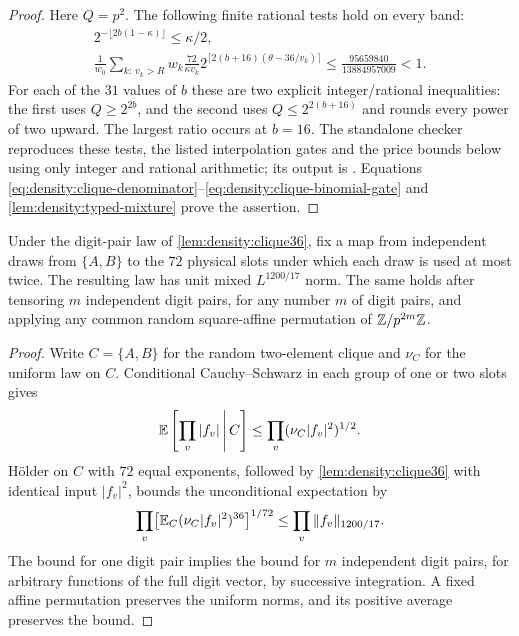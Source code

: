 \begin{proof}
Here $Q=p^2$. The following finite rational tests hold on every band:
\begin{gather}
 2^{-\lfloor2b(1-\kappa)\rfloor}\le\kappa/2,
 \label{eq:density:clique-denominator}\\
 \frac1{w_0}\sum_{k:\,v_k>R}w_k\frac{72}{\kappa v_k}
 2^{\lceil2(b+16)(\theta-36/v_k)\rceil}
 \le\frac{95659840}{13884957009}<1.
 \label{eq:density:clique-binomial-gate}
\end{gather}
For each of the $31$ values of $b$ these are two explicit integer/rational inequalities: the first uses
$Q\ge2^{2b}$, and the second uses $Q\le2^{2(b+16)}$ and rounds every power
of two upward. The largest ratio occurs at $b=16$.
The standalone checker
reproduces these tests, the listed interpolation gates and the price
bounds below using only integer and rational arithmetic; its output is
.
Equations \eqref{eq:density:clique-denominator}--\eqref{eq:density:clique-binomial-gate}
and \cref{lem:density:typed-mixture} prove the assertion.
\end{proof}

\begin{lemma}\label{lem:density:clique-copies}
Under the digit-pair law of \cref{lem:density:clique36}, fix a map from independent draws from $\{A,B\}$ to the $72$ physical slots under which each draw is used at most twice.
The resulting law has unit mixed $L^{1200/17}$ norm. The same holds after
tensoring $m$ independent digit pairs, for any number $m$ of
digit pairs, and applying any common random square-affine
permutation of $\mathbb Z/p^{2m}\mathbb Z$.
\end{lemma}
\begin{proof}
Write $C=\{A,B\}$ for the random two-element clique and $\nu_C$ for the uniform law on $C$.
Conditional Cauchy--Schwarz in each group of one or two slots gives
\[
 \mathbb E\left[\prod_v|f_v|\,\middle|\,C\right]
 \le\prod_v(\nu_C|f_v|^2)^{1/2}.
\]
H\"older on $C$ with $72$ equal exponents, followed by
\cref{lem:density:clique36} with identical input $|f_v|^2$, bounds the
unconditional expectation by
\[
 \prod_v\bigl[\mathbb E_C(\nu_C|f_v|^2)^{36}\bigr]^{1/72}
 \le\prod_v\|f_v\|_{1200/17}.
\]
The bound for one digit pair implies the bound for $m$ independent digit pairs, for arbitrary functions of the full digit vector, by successive integration. A fixed affine permutation
preserves the uniform norms, and its positive average preserves the bound.
\end{proof}

